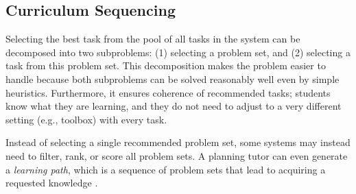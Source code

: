 

\subsection{Curriculum Sequencing}



Selecting the best task from the pool of all tasks in the system
can be decomposed into two subproblems: (1) selecting a problem set,
and (2) selecting a task from this problem set.
This decomposition makes the problem easier to handle because
both subproblems can be solved reasonably well even by simple heuristics.
Furthermore, it ensures coherence of recommended tasks;
students know what they are learning, and they do not need to adjust to a very
different setting (e.g., toolbox) with every task.

Instead of selecting a single recommended problem set, some systems may
instead need to filter, rank, or score all problem sets.
A planning tutor can even generate a \emph{learning path}, which is a sequence
of problem sets that lead to acquiring a requested knowledge
\cite{its-programming}.


